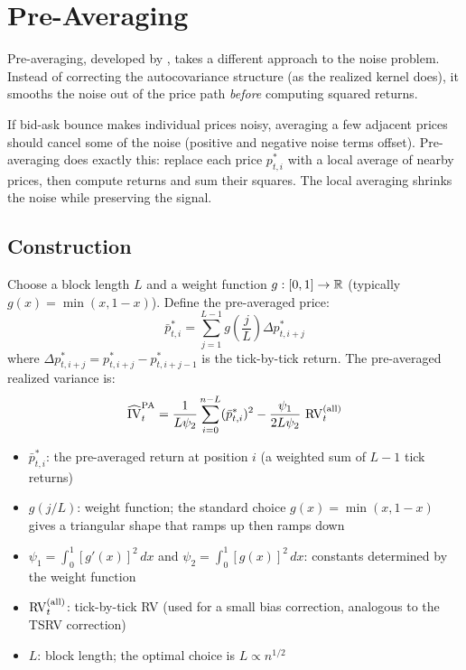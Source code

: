 \section{Pre-Averaging}
\label{sec:pre-averaging}

Pre-averaging, developed by \citet{JacodLiMyklandPodolskijVetter2009}, takes a different approach to the noise problem.
Instead of correcting the autocovariance structure (as the realized kernel does), it smooths the noise out of the price path \emph{before} computing squared returns.

\begin{intuition}
If bid-ask bounce makes individual prices noisy, averaging a few adjacent prices should cancel some of the noise (positive and negative noise terms offset).
Pre-averaging does exactly this: replace each price $p^*_{t,i}$ with a local average of nearby prices, then compute returns and sum their squares.
The local averaging shrinks the noise while preserving the signal.
\end{intuition}

\subsection{Construction}

\begin{definition}
Choose a block length $L$ and a weight function $g:[0,1] \to \mathbb{R}$ (typically $g(x) = \min(x, 1-x)$).
Define the pre-averaged price:
\begin{equation}
  \bar{p}^*_{t,i} = \sum_{j=1}^{L-1} g\!\left(\frac{j}{L}\right) \Delta p^*_{t,i+j}
  \label{eq:pre-avg-price}
\end{equation}
where $\Delta p^*_{t,i+j} = p^*_{t,i+j} - p^*_{t,i+j-1}$ is the tick-by-tick return.
The pre-averaged realized variance is:
\begin{equation}
  \widehat{\operatorname{IV}}_t^{\text{PA}} = \frac{1}{L \psi_2} \sum_{i=0}^{n - L} (\bar{p}^*_{t,i})^2 - \frac{\psi_1}{2 L \psi_2}\, \operatorname{RV}^{(\text{all})}_t
  \label{eq:pre-avg-rv}
\end{equation}
\begin{itemize}[nosep]
  \item $\bar{p}^*_{t,i}$: the pre-averaged return at position $i$ (a weighted sum of $L-1$ tick returns)
  \item $g(j/L)$: weight function; the standard choice $g(x) = \min(x, 1-x)$ gives a triangular shape that ramps up then ramps down
  \item $\psi_1 = \int_0^1 [g'(x)]^2\,dx$ and $\psi_2 = \int_0^1 [g(x)]^2\,dx$: constants determined by the weight function
  \item $\operatorname{RV}^{(\text{all})}_t$: tick-by-tick RV (used for a small bias correction, analogous to the TSRV correction)
  \item $L$: block length; the optimal choice is $L \propto n^{1/2}$
\end{itemize}
\end{definition}

